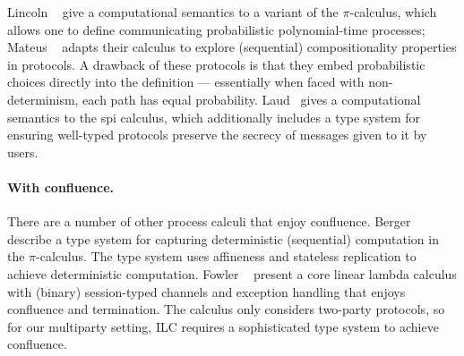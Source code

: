 
Lincoln \etal~\cite{lincoln1998probabilistic} give a computational semantics to
a variant of the $\pi$-calculus, which allows one to define communicating
probabilistic polynomial-time processes; Mateus
\etal~\cite{mateus2003composition} adapts their calculus to explore (sequential)
compositionality properties in protocols.
A drawback of these protocols is that they embed probabilistic choices directly
into the definition --- essentially when faced with non-determinism, each path
has equal probability.
Laud~\cite{laud2005secrecy} gives a
computational semantics to the spi calculus, which additionally includes a type
system for ensuring well-typed protocols preserve the secrecy of messages given
to it by users.


\paragraph{With confluence.}
There are a number of other process calculi that enjoy confluence.  Berger
\etal~\cite{berger2001sequentiality} describe a type system for capturing
deterministic (sequential) computation in the $\pi$-calculus. The type system uses
affineness and stateless replication to achieve deterministic computation.
Fowler \etal~\cite{fowler2018session} present a core linear lambda calculus with
(binary) session-typed channels and exception handling that enjoys confluence
and termination.
The calculus only considers two-party protocols, so for our multiparty setting,
ILC requires a sophisticated type system to achieve confluence.

